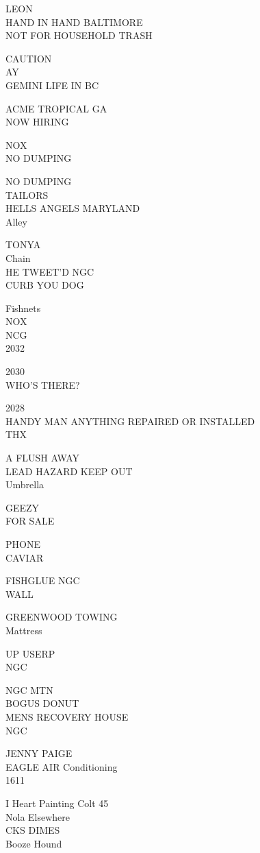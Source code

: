 \documentclass[10pt,letterpaper]{article}
\begin{document}
LEON\\
HAND IN HAND BALTIMORE\\
NOT FOR HOUSEHOLD TRASH

CAUTION\\
AY\\
GEMINI LIFE IN BC

ACME TROPICAL GA\\
NOW HIRING

NOX\\
NO DUMPING

NO DUMPING\\
TAILORS\\
HELLS ANGELS MARYLAND\\
Alley

TONYA\\
Chain\\
HE TWEET'D NGC\\
CURB YOU DOG

Fishnets\\
NOX\\
NCG\\
2032

2030\\
WHO'S THERE?

2028\\
HANDY MAN ANYTHING REPAIRED OR INSTALLED\\
THX

A FLUSH AWAY\\
LEAD HAZARD KEEP OUT\\
Umbrella

GEEZY\\
FOR SALE

PHONE\\
CAVIAR

FISHGLUE NGC\\
WALL

GREENWOOD TOWING\\
Mattress

UP USERP\\
NGC

NGC MTN\\
BOGUS DONUT\\
MENS RECOVERY HOUSE\\
NGC

JENNY PAIGE\\
EAGLE AIR Conditioning\\
1611

I Heart Painting Colt 45\\
Nola Elsewhere\\
CKS DIMES\\
Booze Hound
\end{document}

